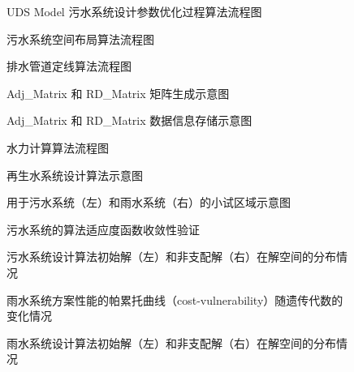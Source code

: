 \documentclass[degree=doctor]{sysuthesis}
\begin{document}
\clearpage
\setcounter{page}{101}
\begin{figure}
  \centering
  \caption{UDS Model 污水系统设计参数优化过程算法流程图}
\end{figure}

\clearpage
\setcounter{page}{103}
\begin{figure}
  \centering
  \caption{污水系统空间布局算法流程图}
\end{figure}

\begin{figure}
  \centering
  \caption{排水管道定线算法流程图}
\end{figure}

\begin{figure}
  \centering
  \caption{Adj\_Matrix 和 RD\_Matrix 矩阵生成示意图}
\end{figure}

\clearpage
\setcounter{page}{104}
\begin{figure}
  \centering
  \caption{Adj\_Matrix 和 RD\_Matrix 数据信息存储示意图}
\end{figure}

\begin{figure}
  \centering
  \caption{水力计算算法流程图}
\end{figure}

\begin{figure}
  \centering
  \caption{再生水系统设计算法示意图}
\end{figure}

\clearpage
\setcounter{page}{106}
\begin{figure}
  \centering
  \caption{用于污水系统（左）和雨水系统（右）的小试区域示意图}
\end{figure}

\begin{figure}
  \centering
  \caption{污水系统的算法适应度函数收敛性验证}
\end{figure}

\begin{figure}
  \centering
  \caption{污水系统设计算法初始解（左）和非支配解（右）在解空间的分布情况}
\end{figure}

\clearpage
\setcounter{page}{107}
\begin{figure}
  \centering
  \caption{雨水系统方案性能的帕累托曲线（cost-vulnerability）随遗传代数的变化情况}
\end{figure}

\begin{figure}
  \centering
  \caption{雨水系统设计算法初始解（左）和非支配解（右）在解空间的分布情况}
\end{figure}
\end{document}
